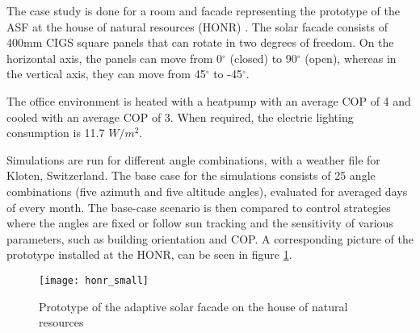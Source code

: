 		The case study is done for a room and facade representing the prototype of the ASF at the house of natural resources (HONR) \cite{nagy2015frontiers}.  The solar facade consists of 400mm CIGS square panels that can rotate in two degrees of freedom. On the horizontal axis, the panels can move from 0$^{\circ}$ (closed) to 90$^{\circ}$ (open), whereas in the vertical axis, they can move from 45$^{\circ}$ to -45$^{\circ}$. %

		The office environment is heated with a heatpump with an average COP of 4 and cooled with an average COP of 3. When required, the electric lighting consumption is 11.7 $W/m^2$. 


		Simulations are run for different angle combinations, with a weather file for Kloten, Switzerland. The base case for the simulations consists of 25 angle combinations (five azimuth and five altitude angles), evaluated for averaged days of every month. The base-case scenario is then compared to control strategies where the angles are fixed or follow sun tracking and the sensitivity of various parameters, such as building orientation and COP. A corresponding picture of the prototype installed at the HONR, can be seen in figure \ref{fig:honr}. 

		\begin{figure}[ht] %
			\begin{center}
			\texttt{[image: honr\_small]}
			\caption{Prototype of the adaptive solar facade on the house of natural resources}
			\label{fig:honr}
			\end{center} 
		\end{figure}



